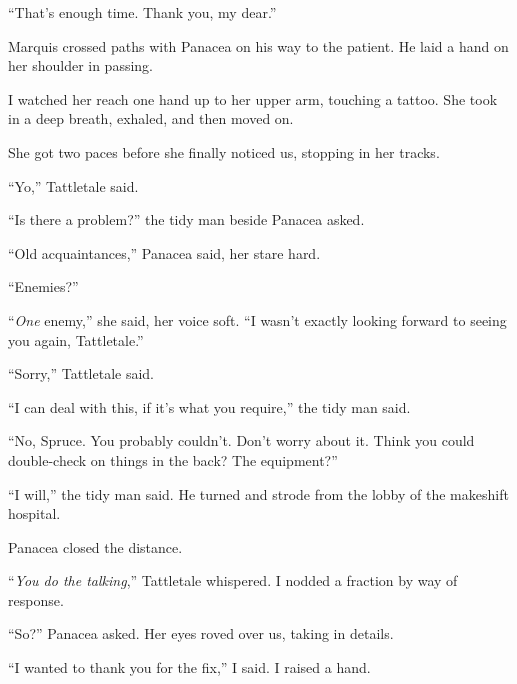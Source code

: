 ``That's enough time.  Thank you, my dear.''



Marquis crossed paths with Panacea on his way to the patient.  He laid a hand on her shoulder in passing.



I watched her reach one hand up to her upper arm, touching a tattoo.  She took in a deep breath, exhaled, and then moved on.



She got two paces before she finally noticed us, stopping in her tracks.



``Yo,'' Tattletale said.



``Is there a problem?'' the tidy man beside Panacea asked.



``Old acquaintances,'' Panacea said, her stare hard.



``Enemies?''



``\emph{One} enemy,'' she said, her voice soft.  ``I wasn't exactly looking forward to seeing you again, Tattletale.''



``Sorry,'' Tattletale said.



``I can deal with this, if it's what you require,'' the tidy man said.



``No, Spruce.  You probably couldn't.  Don't worry about it.  Think you could double-check on things in the back?  The equipment?''



``I will,'' the tidy man said.  He turned and strode from the lobby of the makeshift hospital.



Panacea closed the distance.



``\emph{You do the talking},'' Tattletale whispered.  I nodded a fraction by way of response.



``So?'' Panacea asked.  Her eyes roved over us, taking in details.



``I wanted to thank you for the fix,'' I said.  I raised a hand.



